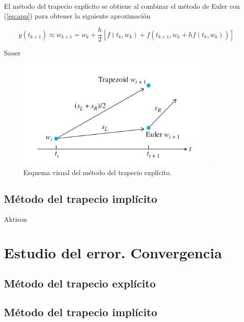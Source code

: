 \documentclass{article}
\theoremstyle{theorem-style}  %
\theoremstyle{definition}
\theoremstyle{example-style}
\begin{document}
		El método del trapecio explícito se obtiene al combinar el método de Euler con (\ref{eq:app}) para obtener la siguiente aproximación

		\begin{equation} \label{eq:app-exp}
			y(t_{k+1}) \approx w_{k+1} = w_k + \frac{h}{2} \left[f(t_k,w_k) + f(t_{k+1}, w_k + h f(t_k,w_k))\right]
		\end{equation}

		Sauer
			
		\begin{figure}[h]
			\centering
			\includegraphics[width=10cm]{./Images/trapecio-vs-euler.png}
			\caption{Esquema visual del método del trapecio explícito.} 
			\label{fig:trapecio-vs-euler}
		\end{figure}

	\subsection{Método del trapecio implícito}


		Aktison



\section{Estudio del error. Convergencia}

	\subsection{Método del trapecio explícito}
	
	\subsection{Método del trapecio implícito}
\end{document}

